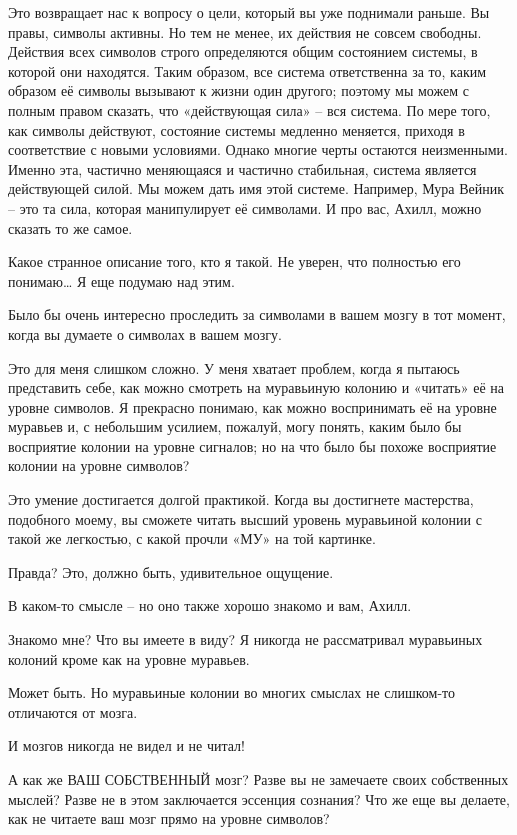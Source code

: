 \documentclass[../main.tex]{subfiles}
\begin{document}
\begin{dialogue}
 Это возвращает нас к вопросу о цели, который вы уже поднимали раньше. Вы правы, символы активны. Но тем не менее, их действия не совсем свободны. Действия всех символов строго определяются общим состоянием системы, в которой они находятся. Таким образом, все система ответственна за то, каким образом её символы вызывают к жизни один другого; поэтому мы можем с полным правом сказать, что «действующая сила» \--- вся система. По мере того, как символы действуют, состояние системы медленно меняется, приходя в соответствие с новыми условиями. Однако многие черты остаются неизменными. Именно эта, частично меняющаяся и частично стабильная, система является действующей силой. Мы можем дать имя этой системе. Например, Мура Вейник \--- это та сила, которая манипулирует её символами. И про вас, Ахилл, можно сказать то же самое.

 Какое странное описание того, кто я такой. Не уверен, что полностью его понимаю\ldots{} Я еще подумаю над этим.

 Было бы очень интересно проследить за символами в вашем мозгу в тот момент, когда вы думаете о символах в вашем мозгу.

 Это для меня слишком сложно. У меня хватает проблем, когда я пытаюсь представить себе, как можно смотреть на муравьиную колонию и «читать» её на уровне символов. Я прекрасно понимаю, как можно воспринимать её на уровне муравьев и, с небольшим усилием, пожалуй, могу понять, каким было бы восприятие колонии на уровне сигналов; но на что было бы похоже восприятие колонии на уровне символов?

 Это умение достигается долгой практикой. Когда вы достигнете мастерства, подобного моему, вы сможете читать высший уровень муравьиной колонии с такой же легкостью, с какой прочли «МУ» на той картинке.

 Правда? Это, должно быть, удивительное ощущение.

 В каком-то смысле \--- но оно также хорошо знакомо и вам, Ахилл.

 Знакомо мне? Что вы имеете в виду? Я никогда не рассматривал муравьиных колоний кроме как на уровне муравьев.

 Может быть. Но муравьиные колонии во многих смыслах не слишком-то отличаются от мозга.

 И мозгов никогда не видел и не читал!

 А как же ВАШ СОБСТВЕННЫЙ мозг? Разве вы не замечаете своих собственных мыслей? Разве не в этом заключается эссенция сознания? Что же еще вы делаете, как не читаете ваш мозг прямо на уровне символов?


\end{dialogue}
\end{document}
